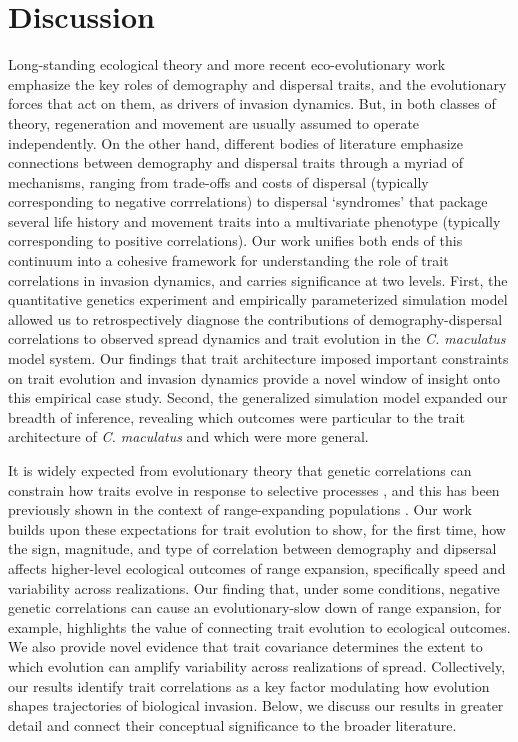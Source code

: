 \documentclass[11pt]{article}
\begin{document}
\section*{Discussion}
Long-standing ecological theory and more recent eco-evolutionary work emphasize the key roles of demography and dispersal traits, and the evolutionary forces that act on them, as drivers of invasion dynamics.
But, in both classes of theory, regeneration and movement are usually assumed to operate independently.
On the other hand, different bodies of literature emphasize connections between demography and dispersal traits through a myriad of mechanisms, ranging from trade-offs and costs of dispersal (typically corresponding to negative corrrelations) to dispersal `syndromes' that package several life history and movement traits into a multivariate phenotype (typically corresponding to positive correlations).
Our work unifies both ends of this continuum into a cohesive framework for understanding the role of trait correlations in invasion dynamics, and carries significance at two levels.
First, the quantitative genetics experiment and empirically parameterized simulation model allowed us to retrospectively diagnose the contributions of demography-dispersal correlations to observed spread dynamics and trait evolution in the \textit{C. maculatus} model system.
Our findings that trait architecture imposed important constraints on trait evolution and invasion dynamics provide a novel window of insight onto this empirical case study.
Second, the generalized simulation model expanded our breadth of inference, revealing which outcomes were particular to the trait architecture of \textit{C. maculatus} and which were more general.

It is widely expected from evolutionary theory that genetic correlations can constrain how traits evolve in response to selective processes \citep{schluter1996adaptive,walsh2009abundant}, and this has been previously shown in the context of range-expanding populations \citep{burton_trade-offs_2010,perkins_after_2016,fronhofer_eco-evolutionary_2015}.
Our work builds upon these expectations for trait evolution to show, for the first time, how the sign, magnitude, and type of correlation between demography and dipsersal affects higher-level ecological outcomes of range expansion, specifically speed and variability across realizations.
Our finding that, under some conditions, negative genetic correlations can cause an evolutionary-slow down of range expansion, for example, highlights the value of connecting trait evolution to ecological outcomes.
We also provide novel evidence that trait covariance determines the extent to which evolution can amplify variability across realizations of spread.
Collectively, our results identify trait correlations as a key factor modulating how evolution shapes trajectories of biological invasion.
Below, we discuss our results in greater detail and connect their conceptual significance to the broader literature.
\end{document}
